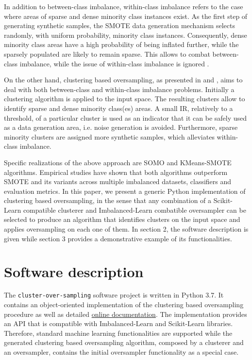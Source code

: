 \documentclass[preprint,12pt, a4paper]{elsarticle}
\begin{document}
In addition to between-class imbalance, within-class imbalance refers to the case where areas of sparse and dense minority class instances exist. As the first step of generating synthetic samples, the SMOTE data generation mechanism selects randomly, with uniform probability, minority class instances. Consequently, dense minority class areas have a high probability of being inflated further, while the sparsely populated are likely to remain sparse. This allows to combat between-class imbalance, while the issue of within-class imbalance is ignored \cite{Prati2004}.

On the other hand, clustering based oversampling, as presented in \cite{Douzas2017a} and \cite{Douzas2018}, aims to deal with both between-class and within-class imbalance problems. Initially a clustering algorithm is applied to the input space. The resulting clusters allow to identify sparse and dense minority class(es) areas. A small IR, relatively to a threshold, of a particular cluster is used as an indicator that it can be safely used as a data generation area, i.e. noise generation is avoided. Furthermore, sparse minority clusters are assigned more synthetic samples, which alleviates within-class imbalance.

Specific realizations of the above approach are SOMO \cite{Douzas2017a} and KMeans-SMOTE \cite{Douzas2018} algorithms. Empirical studies have shown that both algorithms outperform SMOTE and its variants across multiple imbalanced datasets, classifiers and evaluation metrics. In this paper, we present a generic Python implementation of clustering based oversampling, in the sense that any combination of a Scikit-Learn compatible clusterer and Imbalanced-Learn combatible oversampler can be selected to produce an algorithm that identifies clusters on the input space and applies oversampling on each one of them.  In section 2, the software description is given while section 3 provides a demonstrative example of its functionalities.

\section{Software description}

The \texttt{cluster-over-sampling} software project is written in Python 3.7. It contains an object-oriented implementation of the clustering based oversampling procedure as well as detailed \href{https://cluster-over-sampling.readthedocs.io/}{online documentation}. The implementation provides an API that is compatible with Imbalanced-Learn and Scikit-Learn libraries. Therefore, standard machine learning functionalities are supported while the generated clustering based oversampling algorithm, composed by a clusterer and an oversampler, contains the initial oversampler functionality as a special case.
\end{document}
